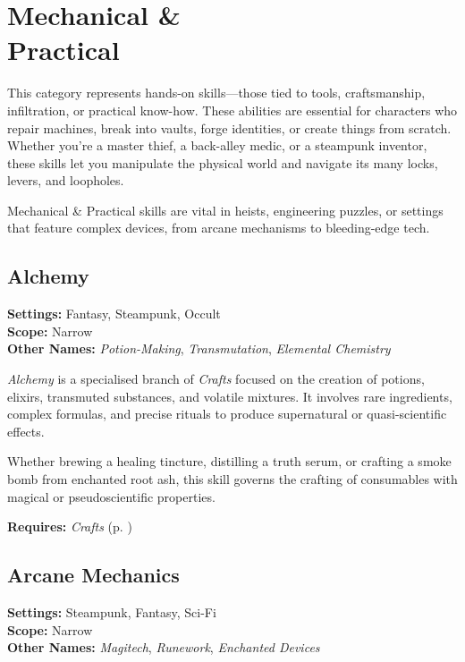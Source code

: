 \section[Mechanical \& Practical]{Mechanical \&\\ Practical}

This category represents hands-on skills—those tied to tools, craftsmanship, infiltration, or practical know-how. These abilities are essential for characters who repair machines, break into vaults, forge identities, or create things from scratch. Whether you’re a master thief, a back-alley medic, or a steampunk inventor, these skills let you manipulate the physical world and navigate its many locks, levers, and loopholes.

Mechanical \& Practical skills are vital in heists, engineering puzzles, or settings that feature complex devices, from arcane mechanisms to bleeding-edge tech.


\subsection{Alchemy}\label{skill:alchemy}
\textbf{Settings:} Fantasy, Steampunk, Occult\\
\textbf{Scope:} Narrow\\
\textbf{Other Names:} \emph{Potion-Making}, \emph{Transmutation}, \emph{Elemental Chemistry}\\
\vspace{\baselineskip}

\emph{Alchemy} is a specialised branch of \emph{Crafts} focused on the creation of potions, elixirs, transmuted substances, and volatile mixtures. It involves rare ingredients, complex formulas, and precise rituals to produce supernatural or quasi-scientific effects.

Whether brewing a healing tincture, distilling a truth serum, or crafting a smoke bomb from enchanted root ash, this skill governs the crafting of consumables with magical or pseudoscientific properties.

\vspace{0.5\baselineskip}
\noindent\textbf{Requires:} \emph{Crafts} (p. \pageref{skill:crafts})


\subsection{Arcane Mechanics}\label{skill:arcane-mechanics}
\textbf{Settings:} Steampunk, Fantasy, Sci-Fi\\
\textbf{Scope:} Narrow\\
\textbf{Other Names:} \emph{Magitech}, \emph{Runework}, \emph{Enchanted Devices}\\
\vspace{\baselineskip}

